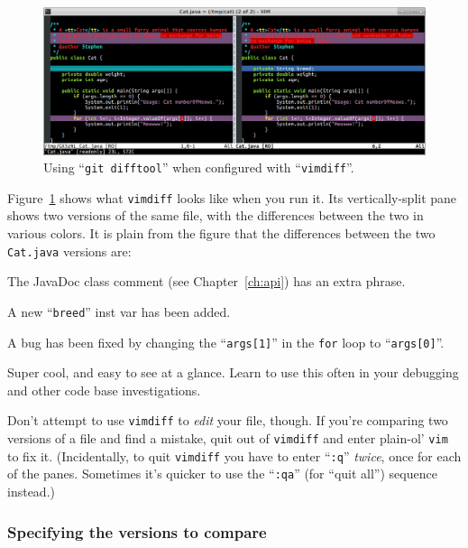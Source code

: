 \begin{figure}
\centering
\includegraphics[width=1.1\textwidth]{catDiff.png}
\vspace{-.05in}
\caption{Using ``\texttt{git difftool}'' when configured with ``\texttt{vimdiff}''.}
\label{fig:catDiff}
\end{figure}

Figure~\ref{fig:catDiff} shows what \texttt{vimdiff} looks like when you run
it. Its vertically-split pane shows two versions of the same file, with the
differences between the two in various colors. It is plain from the figure
that the differences between the two \texttt{Cat.java} versions are:

\begin{compactenum}
\item The JavaDoc class comment (see Chapter~\ref{ch:api}) has an extra phrase.
\item A new ``\texttt{breed}'' inst var has been added.
\item A bug has been fixed by changing the ``\texttt{args[1]}'' in the
\texttt{for} loop to ``\texttt{args[0]}''.
\end{compactenum}

Super cool, and easy to see at a glance. Learn to use this often in your
debugging and other code base investigations.

Don't attempt to use \texttt{vimdiff} to \textit{edit} your file, though. If
you're comparing two versions of a file and find a mistake, quit out of
\texttt{vimdiff} and enter plain-ol' \texttt{vim} to fix it. (Incidentally, to
quit \texttt{vimdiff} you have to enter ``\texttt{:q}'' \textit{twice}, once
for each of the panes. Sometimes it's quicker to use the ``\texttt{:qa}'' (for
``quit all'') sequence instead.)

\subsubsection{Specifying the versions to compare}

